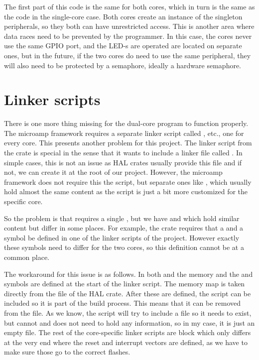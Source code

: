 The first part of this code is the same for both cores, which in turn is the same as the code in the single-core case. Both cores create an instance of the singleton peripherals, so they both can have unrestricted access. This is another area where data races need to be prevented by the programmer. In this case, the cores never use the same GPIO port, and the LED-s are operated are located on separate ones, but in the future, if the two cores do need to use the same peripheral, they will also need to be protected by a semaphore, ideally a hardware semaphore.

\section{Linker scripts}

There is one more thing missing for the dual-core program to function properly. The microamp framework requires a separate linker script called ,  etc., one for every core. This presents another problem for this project. The  linker script from the  crate is special in the sense that it wants to include a linker file called . In simple cases, this is not an issue as HAL crates usually provide this file and if not, we can create it at the root of our project. However, the microamp framework does not require this the  script, but separate ones like , which usually hold almost the same content as the  script is just a bit more customized for the specific core.

So the problem is that  requires a single , but we have  and  which hold similar content but differ in some places. For example, the  crate requires that a  and a  symbol be defined in one of the linker scripts of the project. However exactly these symbols need to differ for the two cores, so this definition cannot be at a common place.

The workaround for this issue is as follows. In both  and  the memory and the  and  symbols are defined at the start of the linker script. The memory map is taken directly from the  file of the HAL crate. After these are defined, the  script can be included so it is part of the build process. This means that it can be removed from the  file. As we know, the  script will try to include a  file so it needs to exist, but cannot and does not need to hold any information, so in my case, it is just an empty file. The rest of the core-specific linker scripts are  block which only differs at the very end where the reset and interrupt vectors are defined, as we have to make sure those go to the correct flashes.


